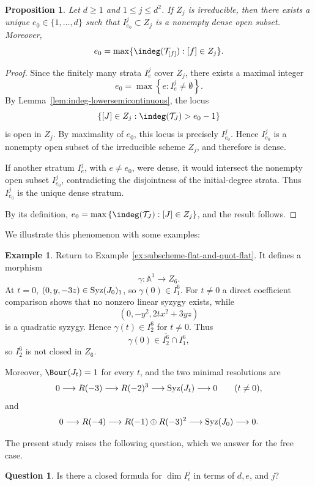 \documentclass[11pt]{amsart} %
\newcommand{\lar}{\longrightarrow}
\newtheorem{Proposition}[Theorem]{Proposition}
\theoremstyle{definition}
\newtheorem{Example}[Theorem]{Example}
\newtheorem{Question}[Theorem]{Question}
\def\syz{\mbox{\rm Syz}}
\def\T{{\mathcal T}}
\begin{document}
\begin{Proposition}\label{prop:generic-initial-degree}
Let $d \geq 1$ and $1 \leq j \leq d^2$. If $Z_j$ is irreducible, then there exists a unique $e_0 \in \{1, \ldots, d\}$ such that $I_{e_0}^j \subset Z_j$ is a nonempty dense open subset. Moreover,
$$
e_0 = \max\{ \indeg(\T_{[f]}): [f] \in Z_j \}.
$$
\end{Proposition}

\begin{proof}
Since the finitely many strata $I_e^j$ cover $Z_j$, there exists a
maximal integer
\[
e_0
=
\max\left\{
e:I_e^j\neq\emptyset
\right\}.
\]
By Lemma~\ref{lem:indeg-lowersemicontinuous}, the locus
\[
\left\{
[J]\in Z_j:
\indeg(\T_J)>e_0-1
\right\}
\]
is open in $Z_j$. By maximality of $e_0$, this locus is precisely
$I_{e_0}^j$. Hence $I_{e_0}^j$ is a nonempty open subset of the
irreducible scheme $Z_j$, and therefore is dense.

If another stratum $I_e^j$, with $e\neq e_0$, were dense, it would
intersect the nonempty open subset $I_{e_0}^j$, contradicting the
disjointness of the initial-degree strata. Thus $I_{e_0}^j$ is the
unique dense stratum.

By its definition, \(e_0=\max\left\{
\indeg(\T_J):[J]\in Z_j
\right\}\), and the result follows.
\end{proof}

We illustrate this phenomenon with some examples:

\begin{Example}
Return to Example~\ref{ex:subscheme-flat-and-quot-flat}. It defines
a morphism
\[
\gamma:\mathbb A^1\longrightarrow Z_6.
\]
At $t=0$, \((0,y,-3z) \in \syz(J_0)_1\), so \(\gamma(0)\in I_1^6\). For $t\neq0$ a direct coefficient comparison shows that no nonzero
linear syzygy exists, while
\[
(0,-y^2,2tx^2+3yz)
\]
is a quadratic syzygy. Hence
\(\gamma(t)\in I_2^6\) for $t \neq 0$. Thus
\[
\gamma(0)\in
\overline{I_2^6}\cap I_1^6,
\]
so $I_2^6$ is not closed in $Z_6$.

Moreover, \(\Bour(J_t)=1\) for every $t$, and the two minimal resolutions are
\[
0\lar R(-3)\lar R(-2)^3\lar\syz(J_t)\lar0
\qquad(t\neq0),
\]
and
\[
0\lar R(-4)\lar
R(-1)\oplus R(-3)^2
\lar\syz(J_0)\lar0.
\]
\end{Example}

The present study raises the following question, which we answer for the free case.

\begin{Question}
Is there a closed formula for
\(\dim I_e^j\)
in terms of $d,e$, and $j$?
\end{Question}
\end{document}
